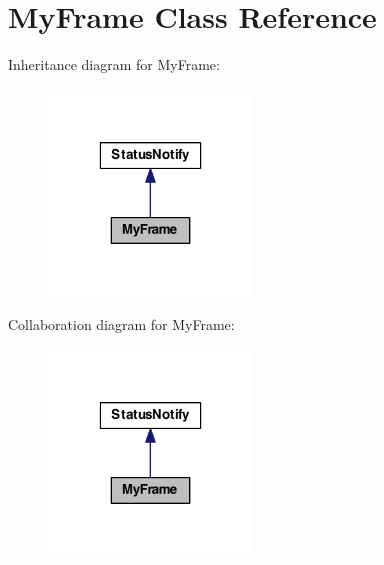 \hypertarget{class_my_frame}{\section{My\-Frame Class Reference}
\label{class_my_frame}
}


Inheritance diagram for My\-Frame\-:
\nopagebreak
\begin{figure}[H]
\begin{center}
\leavevmode
\includegraphics[width=154pt]{class_my_frame__inherit__graph}
\end{center}
\end{figure}


Collaboration diagram for My\-Frame\-:
\nopagebreak
\begin{figure}[H]
\begin{center}
\leavevmode
\includegraphics[width=154pt]{class_my_frame__coll__graph}
\end{center}
\end{figure}
